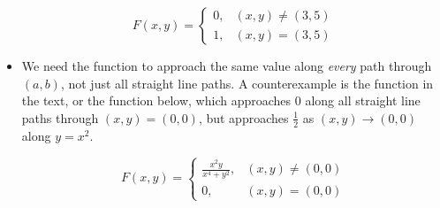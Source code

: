 \documentclass{ximera}
\begin{document}
\begin{exercise}
\begin{feedback}[correct]
\begin{itemize}
\[
F(x,y) = \begin{cases} 0, & (x,y) \neq (3,5) \\ 1, & (x,y) =(3,5) \end{cases}
\]

\item We need the function to approach the same value along \emph{every} path through $(a,b)$, not just all straight line paths.  A counterexample is the function in the text, or the function below, which approaches $0$ along all straight line paths through $(x,y) = (0,0)$, but approaches $\frac{1}{2}$ as $(x,y) \to (0,0)$ along $y=x^2$.

\[
F(x,y) = \begin{cases} \frac{x^2y}{x^4+y^2}, & (x,y) \neq (0,0) \\ 0, & (x,y) =(0,0) \end{cases}
\]

\end{itemize}
\end{feedback}
 \end{exercise}
\end{document}

